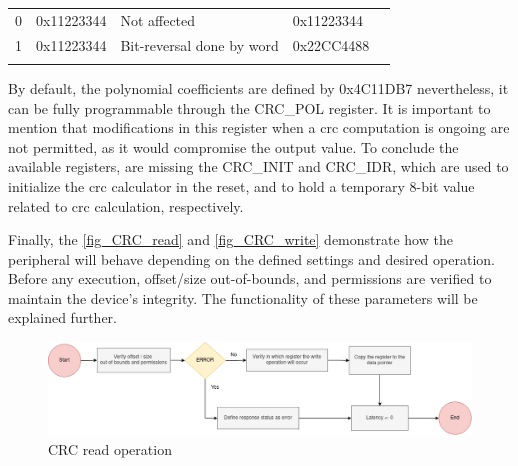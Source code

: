 \begin{table}[!htb]
\begin{minipage}{.5\linewidth}
{\begin{tabular}{lllll}
		\multicolumn{1}{|l|}{0} & \multicolumn{1}{l|}{0x11223344} & \multicolumn{1}{l|}{Not affected} & \multicolumn{1}{l|}{0x11223344} &  \\ \cline{1-4}
		\multicolumn{1}{|l|}{1} & \multicolumn{1}{l|}{0x11223344} & \multicolumn{1}{l|}{Bit-reversal done by word} & \multicolumn{1}{l|}{0x22CC4488} &  \\ \cline{1-4}
		 &  &  &  & 
		\end{tabular}%
        }   
        \label{tab:CRC_REV_OUT}
    \end{minipage}
	\label{tab:CRC_REV} 
\end{table}

By default, the polynomial coefficients are defined by 0x4C11DB7 nevertheless, it can be fully programmable through the CRC\_POL register.
It is important to mention that modifications in this register when a \gls{crc} computation is ongoing are not permitted, as it would 
compromise the output value. To conclude the available registers, are missing the CRC\_INIT and CRC\_IDR, which are used to initialize 
the \gls{crc} calculator in the reset, and to hold a temporary 8-bit value related to \gls{crc} calculation, respectively. 

Finally, the \autoref{fig_CRC_read} and \autoref{fig_CRC_write} demonstrate how the peripheral will behave depending on the defined settings 
and desired operation. Before any execution, offset/size out-of-bounds, and permissions are verified to maintain the device's integrity. The 
functionality of these parameters will be explained further. 

\begin{figure}[H]
	\centering
 	\includegraphics[width=0.8\linewidth]{Images/CRC_read.png} 
 	\caption{CRC read operation}
	 \label{fig_CRC_read}
\end{figure}

